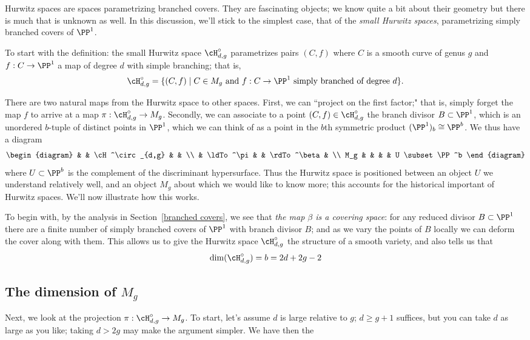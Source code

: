 Hurwitz spaces are spaces parametrizing branched covers. They are fascinating objects; we know quite a bit about their geometry but there is much that is unknown as well. In this discussion, we'll stick to the simplest case, that of the \emph{small Hurwitz spaces}, parametrizing simply branched covers of $\PP^1$.

To start with the definition: the small Hurwitz space $\cH^\circ_{d,g}$ parametrizes pairs $(C, f)$ where $C$ is a smooth curve of genus $g$ and $f : C \to \PP^1$ a map of degree $d$ with simple branching; that is,
$$
\cH^\circ_{d,g} = \{ (C, f) \mid C \in M_g  \text{ and } f:C \to \PP^1 \text{ simply branched of degree } d\}.
$$

There are two natural maps from the Hurwitz space to other spaces. First, we can ``project on the first factor;" that is, simply forget the map $f$ to arrive at a map $\pi : \cH^\circ_{d,g} \to M_g$. Secondly, we can associate to a point $(C,f) \in \cH^\circ_{d,g}$ the branch divisor $B \subset \PP^1$, which is an unordered $b$-tuple of distinct points in $\PP^1$, which we can think of as a point in the $b$th symmetric product $(\PP^1)_b  \cong \PP^b$. We thus have a diagram
$$
\begin{diagram}
& & \cH^\circ_{d,g} & & \\
& \ldTo^\pi & & \rdTo^\beta & \\
M_g & & & & U \subset \PP^b
\end{diagram}
$$
where $U \subset \PP^b$ is the complement of the discriminant hypersurface. Thus the Hurwitz space is positioned between an object $U$ we understand relatively well, and an object $M_g$ about which we would like to know more; this accounts for the historical important of Hurwitz spaces. We'll now illustrate how this works.

To begin with, by the analysis in Section~\ref{branched covers}, we see that \emph{the map $\beta$ is a covering space}: for any reduced divisor $B \subset \PP^1$ there are a finite number of simply branched covers of $\PP^1$ with branch divisor $B$; and as we vary the points of $B$ locally we can deform the cover along with them. This allows us to give the Hurwitz space $\cH^\circ_{d,g}$ the structure of a smooth variety, and also tells us that
$$
\dim(\cH^\circ_{d,g}) = b = 2d+2g-2
$$

\subsection{The dimension of $M_g$} Next, we look at the projection $\pi : \cH^\circ_{d,g} \to M_g$. To start, let's assume $d$ is large relative to $g$; $d \geq g+1$ suffices, but you can take $d$ as large as you like; taking $d > 2g$ may make the argument simpler. We have then the


